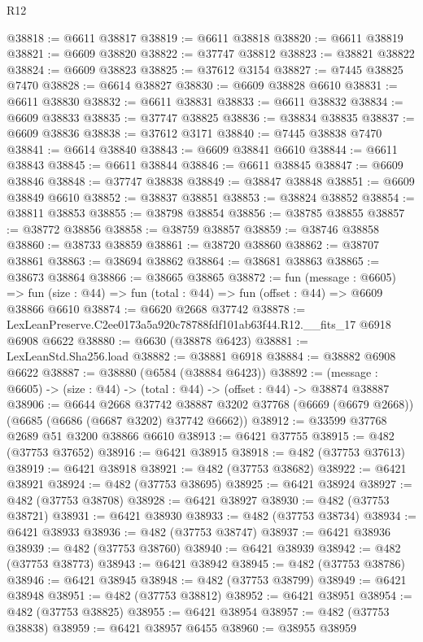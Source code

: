 \begin{lexlean}{R12}
\begin{coremodule}
@38818 := @6611 @38817
@38819 := @6611 @38818
@38820 := @6611 @38819
@38821 := @6609 @38820
@38822 := @37747 @38812
@38823 := @38821 @38822
@38824 := @6609 @38823
@38825 := @37612 @3154
@38827 := @7445 @38825 @7470
@38828 := @6614 @38827
@38830 := @6609 @38828 @6610
@38831 := @6611 @38830
@38832 := @6611 @38831
@38833 := @6611 @38832
@38834 := @6609 @38833
@38835 := @37747 @38825
@38836 := @38834 @38835
@38837 := @6609 @38836
@38838 := @37612 @3171
@38840 := @7445 @38838 @7470
@38841 := @6614 @38840
@38843 := @6609 @38841 @6610
@38844 := @6611 @38843
@38845 := @6611 @38844
@38846 := @6611 @38845
@38847 := @6609 @38846
@38848 := @37747 @38838
@38849 := @38847 @38848
@38851 := @6609 @38849 @6610
@38852 := @38837 @38851
@38853 := @38824 @38852
@38854 := @38811 @38853
@38855 := @38798 @38854
@38856 := @38785 @38855
@38857 := @38772 @38856
@38858 := @38759 @38857
@38859 := @38746 @38858
@38860 := @38733 @38859
@38861 := @38720 @38860
@38862 := @38707 @38861
@38863 := @38694 @38862
@38864 := @38681 @38863
@38865 := @38673 @38864
@38866 := @38665 @38865
@38872 := fun (message : @6605) =>
  fun (size : @44) => fun (total : @44) => fun (offset : @44) => @6609 @38866 @6610
@38874 := @6620 @2668 @37742
@38878 := LexLeanPreserve.C2ee0173a5a920c78788fdf101ab63f44.R12.__fits_17 @6918 @6908 @6622
@38880 := @6630 (@38878 @6423)
@38881 := LexLeanStd.Sha256.load
@38882 := @38881 @6918
@38884 := @38882 @6908 @6622
@38887 := @38880 (@6584 (@38884 @6423))
@38892 := (message : @6605) -> (size : @44) -> (total : @44) -> (offset : @44) -> @38874 @38887
@38906 := @6644
    @2668
    @37742
    @38887
    @3202
    @37768
    (@6669 (@6679 @2668))
    (@6685 (@6686 (@6687 @3202) @37742 @6662))
@38912 := @33599 @37768 @2689 @51 @3200 @38866 @6610
@38913 := @6421 @37755
@38915 := @482 (@37753 @37652)
@38916 := @6421 @38915
@38918 := @482 (@37753 @37613)
@38919 := @6421 @38918
@38921 := @482 (@37753 @38682)
@38922 := @6421 @38921
@38924 := @482 (@37753 @38695)
@38925 := @6421 @38924
@38927 := @482 (@37753 @38708)
@38928 := @6421 @38927
@38930 := @482 (@37753 @38721)
@38931 := @6421 @38930
@38933 := @482 (@37753 @38734)
@38934 := @6421 @38933
@38936 := @482 (@37753 @38747)
@38937 := @6421 @38936
@38939 := @482 (@37753 @38760)
@38940 := @6421 @38939
@38942 := @482 (@37753 @38773)
@38943 := @6421 @38942
@38945 := @482 (@37753 @38786)
@38946 := @6421 @38945
@38948 := @482 (@37753 @38799)
@38949 := @6421 @38948
@38951 := @482 (@37753 @38812)
@38952 := @6421 @38951
@38954 := @482 (@37753 @38825)
@38955 := @6421 @38954
@38957 := @482 (@37753 @38838)
@38959 := @6421 @38957 @6455
@38960 := @38955 @38959

\end{coremodule}
\end{lexlean}
